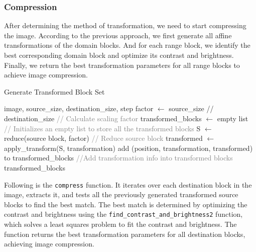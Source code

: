 \documentclass[a4paper,11pt, titlepage]{article}
\theoremstyle{definition}
\theoremstyle{plain}
\theoremstyle{remark}
\theoremstyle{definition}
\begin{document}
\subsubsection{Compression}
After determining the method of transformation, we need to start compressing the image. According to the previous approach, we first generate all affine transformations of the domain blocks. And for each range block, we identify the best corresponding domain block and optimize its contrast and brightness.
Finally, we return the best transformation parameters for all range blocks to achieve image compression.

\begin{algorithm}
\caption{Generate Transformed Block Set}
\begin{algorithmic}[1]
\REQUIRE image, source\_size, destination\_size, step
\STATE factor $\gets$ source\_size // destination\_size \textcolor{gray}{// Calculate scaling factor}
\STATE transformed\_blocks $\gets$ empty list \textcolor{gray}{// Initializes an empty list to store all the transformed blocks}
    \STATE S $\gets$ reduce(source block, factor) \textcolor{gray}{// Reduce source block}
        \STATE transformed $\gets$ apply\_transform(S, transformation) %
        \STATE add (position, transformation, transformed) to transformed\_blocks \textcolor{gray}{//Add transformation info into transformed blocks}
    \ENDFOR
\ENDFOR
\RETURN transformed\_blocks
\end{algorithmic}
\end{algorithm}

Following is the \texttt{compress} function. It iterates over each destination block in the image, extracts it, and tests all the previously generated transformed source blocks to find the best match. The best match is determined by optimizing the contrast and brightness using the \texttt{find\_contrast\_and\_brightness2} function, which solves a least squares problem to fit the contrast and brightness. The function returns the best transformation parameters for all destination blocks, achieving image compression.
\end{document}
